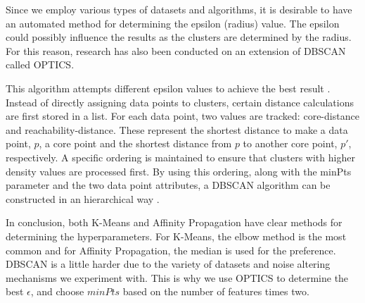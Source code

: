 Since we employ various types of datasets and algorithms, it is desirable to have an automated method for determining the epsilon (radius) value.
The epsilon could possibly influence the results as the clusters are determined by the radius.
For this reason, research has also been conducted on an extension of DBSCAN called OPTICS.

This algorithm attempts different epsilon values to achieve the best result \citep{ankerst_optics_nodate}.
Instead of directly assigning data points to clusters, certain distance calculations are first stored in a list.
For each data point, two values are tracked: core-distance and reachability-distance.
These represent the shortest distance to make a data point, $p$, a core point and the shortest distance from $p$ to another core point, $p'$, respectively.
A specific ordering is maintained to ensure that clusters with higher density values are processed first.
By using this ordering, along with the minPts parameter and the two data point attributes, a DBSCAN algorithm can be constructed in an hierarchical way \citep{schubert_dbscan_2017}. \newline

In conclusion, both K-Means and Affinity Propagation have clear methods for determining the hyperparameters.
For K-Means, the elbow method is the most common and for Affinity Propagation, the median is used for the preference.
DBSCAN is a little harder due to the variety of datasets and noise altering mechanisms we experiment with.
This is why we use OPTICS to determine the best $\epsilon$, and choose $minPts$ based on the number of features times two.

